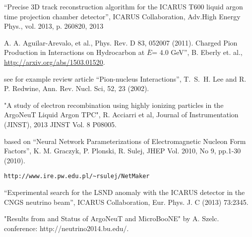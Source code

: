 \begin{thebibliography}{99}
``Precise 3D track reconstruction algorithm for the ICARUS T600 liquid argon time projection chamber detector'', ICARUS Collaboration, 
Adv.High Energy Phys., vol. 2013, p. 260820, 2013

  A. A. Aguilar-Arevalo, et al.,
Phys. Rev. D 83, 052007 (2011).
 Charged Pion Production in Interactions on Hydrocarbon 
at $\overline{E}$= 4.0 GeV'', B. Eberly et. al., \url{http://arxiv.org/abs/1503.01520}.

 see for example review article ``Pion-nucleus Interactions'',
T.~S.~H. Lee and R. P. Redwine, Ann. Rev. Nucl. Sci, 52, 23 (2002).

"A study of electron recombination using highly ionizing particles in the ArgoNeuT Liquid Argon TPC", R. Acciarri et al, Journal of Instrumentation (JINST), 2013 JINST Vol. 8 P08005.

 based on
``Neural Network Parameterizations of Electromagnetic Nucleon Form Factors'', K. M. Graczyk, P. Plonski, R. Sulej, JHEP Vol. 2010, No 9, pp.1-30 (2010).
\begin{verbatim}
http://www.ire.pw.edu.pl/~rsulej/NetMaker
\end{verbatim}



 ``Experimental search for the LSND anomaly with the ICARUS
detector in the CNGS neutrino beam'', ICARUS Collaboration, Eur. Phys. J. C (2013) 73:2345.

 "Results from and Status of ArgoNeuT
and MicroBooNE" by A. Szelc. conference: http://neutrino2014.bu.edu/.



\end{thebibliography}
